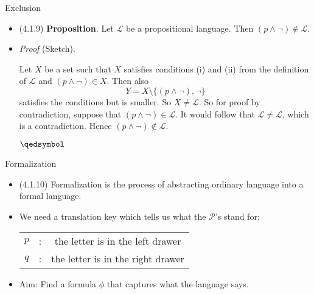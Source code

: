 \begin{frame}{Exclusion}

	\begin{itemize}

		\item (4.1.9) \textbf{Proposition}. Let $\mathcal{L}$ be a propositional language. Then $(p\land \neg)\notin\mathcal{L}$.

		\item \emph{Proof} (Sketch).

		Let $X$ be a set such that $X$ satisfies conditions (i) and (ii) from the definition of $\mathcal{L}$ and $(p\land \neg)\in X$. Then also \[Y=X\setminus \{(p\land \neg), \neg\}\] satisfies the conditions but is smaller. So $X\neq \mathcal{L}$. So for proof by contradiction, suppose that $(p\land \neg)\in\mathcal{L}$. It would follow that $\mathcal{L}\neq\mathcal{L}$, which is a contradiction. Hence $(p\land \neg)\notin\mathcal{L}$. 
		
		\begin{flushright}
		$\qedsymbol$
		\end{flushright}
		

	\end{itemize}

\end{frame}

\begin{frame}{Formalization}

	\begin{itemize}
	
		\item (4.1.10) Formalization is the process of abstracting ordinary language into a formal language.
		
		\item We need a translation key which tells us what the $\mathcal{P}$'s stand for:
		
			\begin{center}
	\begin{tabular}{c c c}
	$p$ & : & the letter is in the left drawer\\
	$q$ & : & the letter is in the right drawer
	\end{tabular}
	\end{center}
	
		\item Aim: Find a formula $\phi$ that captures what the language says. 
	
	\end{itemize}

\end{frame}		

